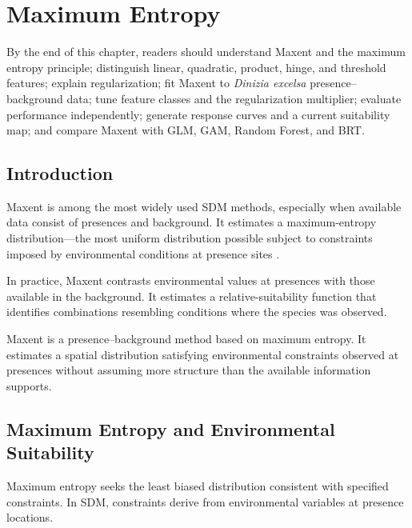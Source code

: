 \chapter[Maxent]{Maximum Entropy}

\begin{objetivos}
By the end of this chapter, readers should understand Maxent and the maximum
entropy principle; distinguish linear, quadratic, product, hinge, and threshold
features; explain regularization; fit Maxent to \textit{Dinizia excelsa}
presence--background data; tune feature classes and the regularization
multiplier; evaluate performance independently; generate response curves and a
current suitability map; and compare Maxent with GLM, GAM, Random Forest, and BRT.
\end{objetivos}

\section{Introduction}

Maxent is among the most widely used SDM methods, especially when available data
consist of presences and background. It estimates a maximum-entropy
distribution---the most uniform distribution possible subject to constraints
imposed by environmental conditions at presence sites
\parencite{phillips2006maximum,phillips2008modeling,elith2011statistical,merow2013practical,guisan2017habitat}.

In practice, Maxent contrasts environmental values at presences with those
available in the background. It estimates a relative-suitability function that
identifies combinations resembling conditions where the species was observed.

\begin{conceito}[title={\faBook\quad Maxent in SDM}]
Maxent is a presence--background method based on maximum entropy. It estimates
a spatial distribution satisfying environmental constraints observed at
presences without assuming more structure than the available information supports.
\end{conceito}

\section{Maximum Entropy and Environmental Suitability}

Maximum entropy seeks the least biased distribution consistent with specified
constraints. In SDM, constraints derive from environmental variables at
presence locations.

